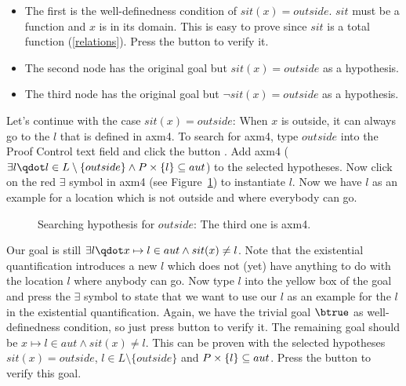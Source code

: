 \begin{itemize}
\item The first is the well-definedness condition of $sit(x) = outside$. $sit$ must be a function and $x$ is in its domain.
  This is easy to prove since $sit$ is a total function (\ref{relations}). Press the  button to verify it.
\item The second node has the original goal but $sit(x) = outside$ as a hypothesis.
\item The third node has the original goal but $\lnot sit(x) = outside$ as a hypothesis.
\end{itemize}


Let's continue with the case $sit(x)=outside$: When $x$ is outside, it can always go to the $l$ that is defined in \textsf{axm4}.
To search for \textsf{axm4}, type $outside$ into the \textsf{Proof Control} text field and click the button . Add \textsf{axm4} ($\exists l\qdot l\in L\setminus\{outside\} \land P\cprod\{l\}\subseteq aut$) to the selected hypotheses. Now click on the red $\exists$ symbol in \textsf{axm4} (see Figure~\ref{fig_tut_10_search_hypotheses})
to instantiate $l$.
Now we have $l$ as an example for a location which is not outside and where everybody can go.
\begin{figure}[!ht]
  \begin{center}
    \caption{Searching hypothesis for $outside$: The third one is \textsf{axm4}.}
    \label{fig_tut_10_search_hypotheses}
  \end{center}
\end{figure}
Our goal is still $\exists l\qdot x\mapsto l\in aut \land sit(x)\neq l$.
Note that the existential quantification introduces a new $l$ which does not (yet) have anything to do with
 the location $l$ where anybody can go.
Now type $l$ into the yellow box of the goal and press the $\exists$ symbol to state that we want to use our $l$ as
  an example for the $l$ in the existential quantification.
Again, we have the trivial goal $\btrue$ as well-definedness condition, so just press  button to verify it.
The remaining goal should be $x\mapsto l\in aut \land sit(x)\neq l$.
This can be proven with the selected hypotheses $sit(x)=outside$, $l\in L\setminus\{outside\}$ and $P\mathbin\times\{l\}\subseteq aut$. Press the  button to verify this goal.

